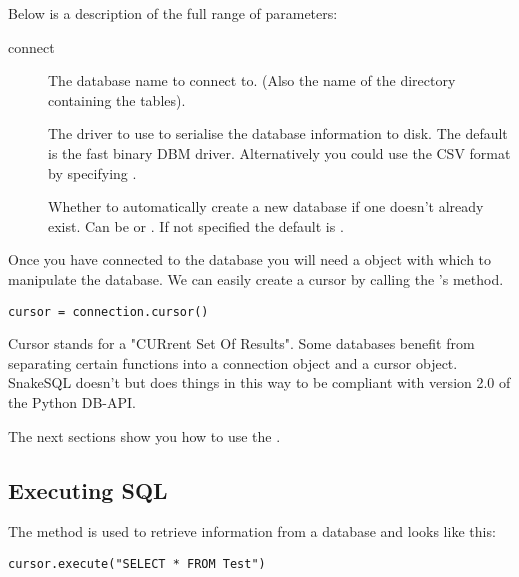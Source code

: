 \documentclass{howto}
\begin{document}
Below is a description of the full range of parameters:

\begin{funcdesc}{connect}{}
\begin{description}

\item[]
The database name to connect to. (Also the name of the directory containing the tables).
\item[]
The driver to use to serialise the database information to disk. The default is the fast binary DBM driver. Alternatively you could use the CSV format by specifying .
\item[]
Whether to automatically create a new database if one doesn't already exist. Can be  or . If not specified the default is .
\end{description}
\end{funcdesc}


Once you have connected to the database you will need a  object with which to manipulate the database. We can easily create a cursor by calling the 's  method.

\begin{verbatim}
cursor = connection.cursor()
\end{verbatim}

Cursor stands for a "CURrent Set Of Results". Some databases benefit from separating certain functions into a connection object and a cursor object. SnakeSQL doesn't but does things in this way to be compliant with version 2.0 of the Python DB-API.

The next sections show you how to use the .

\subsection{Executing SQL}

The  method is used to retrieve information from a database and looks like this:

\begin{verbatim}
cursor.execute("SELECT * FROM Test")
\end{verbatim}
\end{document}
